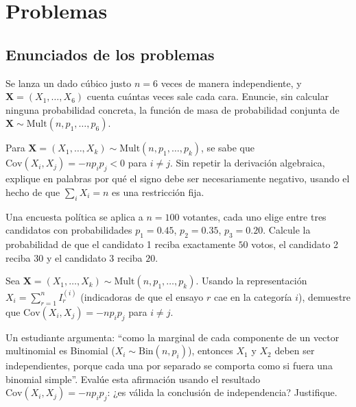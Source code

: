 \section*{Problemas}

\subsection*{Enunciados de los problemas}

\begin{problema}
	\label{prob:2499194}
	Se lanza un dado cúbico justo $n=6$ veces de manera independiente, y $\bm{X}=(X_1,\dots,X_6)$ cuenta cuántas veces sale cada cara. Enuncie, sin calcular ninguna probabilidad concreta, la función de masa de probabilidad conjunta de $\bm{X} \sim \text{Mult}(n,p_1,\dots,p_6)$.
\end{problema}

\begin{problema}
	\label{prob:97df06e}
	Para $\bm{X}=(X_1,\dots,X_k)\sim\text{Mult}(n,p_1,\dots,p_k)$, se sabe que $\text{Cov}(X_i,X_j) = -np_ip_j < 0$ para $i\neq j$. Sin repetir la derivación algebraica, explique en palabras por qué el signo debe ser necesariamente negativo, usando el hecho de que $\sum_i X_i = n$ es una restricción fija.
\end{problema}

\begin{problema}
	\label{prob:33bf5d2}
	Una encuesta política se aplica a $n=100$ votantes, cada uno elige entre tres candidatos con probabilidades $p_1=0.45$, $p_2=0.35$, $p_3=0.20$. Calcule la probabilidad de que el candidato 1 reciba exactamente $50$ votos, el candidato 2 reciba $30$ y el candidato 3 reciba $20$.
\end{problema}

\begin{problema}
	\label{prob:277341a}
	Sea $\bm{X}=(X_1,\dots,X_k)\sim\text{Mult}(n,p_1,\dots,p_k)$. Usando la representación $X_i=\sum_{r=1}^n I_r^{(i)}$ (indicadoras de que el ensayo $r$ cae en la categoría $i$), demuestre que $\text{Cov}(X_i,X_j) = -np_ip_j$ para $i\neq j$.
\end{problema}

\begin{problema}
	\label{prob:81748ff}
	Un estudiante argumenta: ``como la marginal de cada componente de un vector multinomial es Binomial ($X_i \sim \text{Bin}(n,p_i)$), entonces $X_1$ y $X_2$ deben ser independientes, porque cada una por separado se comporta como si fuera una binomial simple''. Evalúe esta afirmación usando el resultado $\text{Cov}(X_i,X_j)=-np_ip_j$: ¿es válida la conclusión de independencia? Justifique.
\end{problema}

